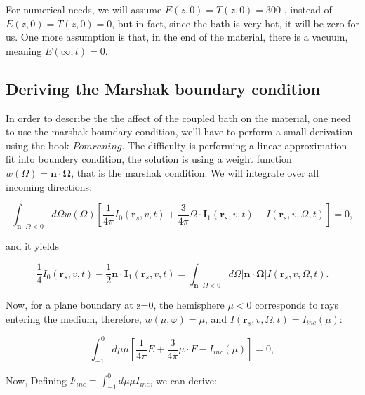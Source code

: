 \documentclass{article}
\begin{document}
For numerical needs, we will assume $E(z,0) = T(z,0) = 300$ , instead of $E(z,0) = T(z,0) = 0$, but in fact, since the bath is very hot, it will be zero for us. One more assumption is that, in the end of the material, there is a vacuum, meaning $E(\infty,t)=0$.


\subsection*{Deriving the Marshak boundary condition}
In order to describe the the affect of the coupled bath on the material, one need to use the marshak boundary condition, 
we'll have to perform a small derivation using the book $Pomraning$. 
The difficulty is performing a linear approximation fit into boundery condition, 
the solution is using a weight function $w(\Omega) = \boldsymbol{n}\cdot \boldsymbol{\Omega}$, 
that is the marshak condition. We will integrate over all incoming directions: 

\begin{equation}
\int_{\mathbf{n}\cdot\Omega < 0} d\Omega w(\Omega) \left[\frac{1}{4\pi} I_0(\mathbf{r}_s, v, t) + \frac{3}{4\pi} \Omega \cdot \mathbf{I}_1(\mathbf{r}_s, v, t) - I(\mathbf{r}_s, v, \Omega, t)\right] = 0,
\end{equation}

and it yields

\begin{equation}
\frac{1}{4}I_0(\mathbf{r}_s, v, t) - \frac{1}{2}\mathbf{n} \cdot \mathbf{I}_1(\mathbf{r}_s, v, t) = \int_{\mathbf{n}\cdot\Omega < 0} d\Omega \left|\mathbf{n}\cdot\mathbf{\Omega}\right| I(\mathbf{r}_s, v, \Omega, t).
\end{equation}

Now, for a plane boundary at z=0, the hemisphere $\mu<0$ corresponds to rays entering the medium, therefore, $w(\mu , \varphi) = \mu$, and $I(\mathbf{r}_s, v, \Omega, t) = I_{inc}(\mu)$: 

\begin{equation}
\int_{-1}^{0}d\mu\mu \left[\frac{1}{4\pi} E + \frac{3}{4\pi} \mu \cdot F - I_{inc}(\mu)\right] = 0,
\end{equation}

Now, Defining $F_{inc} = \int_{-1}^{0}d\mu\mu I_{inc}$, we can derive: 
\end{document}
